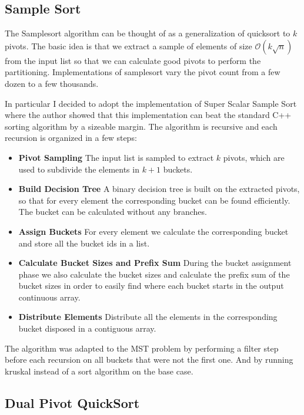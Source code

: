 \documentclass{article}
\begin{document}
\subsection{Sample Sort}

The Samplesort algorithm can be thought of as a generalization of quicksort to $k$ pivots. The basic idea is that we extract a sample of elements of size $\mathcal O(k\sqrt n)$ from the input list so that we can calculate good pivots to perform the partitioning. Implementations of samplesort vary the pivot count from a few dozen to a few thousands.

In particular I decided to adopt the implementation of Super Scalar Sample Sort \cite{samplesort} where the author showed that this implementation can beat the standard C++ sorting algorithm by a sizeable margin. The algorithm is recursive and each recursion is organized in a few steps:

\begin{itemize}
    \item \textbf{Pivot Sampling} The input list is sampled to extract $k$ pivots, which are used to subdivide the elements in $k+1$ buckets.
    \item \textbf{Build Decision Tree} A binary decision tree is built on the extracted pivots, so that for every element the corresponding bucket can be found efficiently. The bucket can be calculated without any branches.
    \item \textbf{Assign Buckets} For every element we calculate the corresponding bucket and store all the bucket ids in a list.
    \item \textbf{Calculate Bucket Sizes and Prefix Sum} During the bucket assignment phase we also calculate the bucket sizes and calculate the prefix sum of the bucket sizes in order to easily find where each bucket starts in the output continuous array.
    \item \textbf{Distribute Elements} Distribute all the elements in the corresponding bucket disposed in a contiguous array.
\end{itemize}

The algorithm was adapted to the MST problem by performing a filter step before each recursion on all buckets that were not the first one. And by running kruskal instead of a sort algorithm on the base case.

\subsection{Dual Pivot QuickSort}
\end{document}

